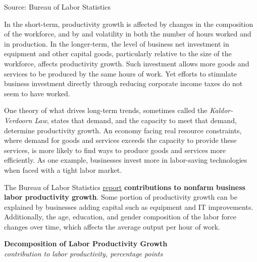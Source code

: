 \documentclass{report}
\makeatletter
\newcommand{\tbllink}[1]{\href{https://raw.githubusercontent.com/bdecon/US-chartbook/master/chartbook/data/#1}{\faTable}}
\newcommand*\short[1]{\expandafter\@gobbletwo\number\numexpr#1\relax}
\newcommand{\sbar}[4]{
		\addplot[ybar stacked, bar width=2.4pt, draw opacity=0, fill=#1] 
			table [x=#2, y=#3, col sep=comma]{#4};}
\newcommand{\dateaxisticks}{
		date coordinates in=x, axis line style={draw=none},
		xmax={2022-10-31},
		max space between ticks=40,	    
		xtick={{1990-01-01}, {1992-01-01}, {1994-01-01}, 
			{1996-01-01}, {1998-01-01}, {2000-01-01}, 
			{2002-01-01}, {2004-01-01}, {2006-01-01},
			{2008-01-01}, {2010-01-01}, {2012-01-01}, {2014-01-01},
		    {2016-01-01}, {2018-01-01}, {2020-01-01}, {2022-01-01}, 
		    {2024-01-01}, {2026-01-01}},
		minor xtick={{1989-01-01}, {1991-01-01}, {1993-01-01},
			{1995-01-01}, {1997-01-01}, {1999-01-01}, 
			{2001-01-01}, {2003-01-01}, {2005-01-01}, {2007-01-01},
		    {2009-01-01}, {2011-01-01}, {2013-01-01}, {2015-01-01},
		    {2017-01-01}, {2019-01-01}, {2021-01-01}, {2023-01-01}, 
		    {2025-01-01}, {2027-01-01}},
		enlarge y limits={0.06}, enlarge x limits={0.01},
		}
\newcommand{\bbar}[2]{extra #1 ticks = {{#2}}, extra #1 tick labels = ,
		extra #1 tick style = {grid=major, grid style={thick, black!25}},}
\newcommand{\rbars}{
		\fill[color=black!10] (axis cs:{1990-07-01},\pgfkeysvalueof{/pgfplots/ymin}) rectangle 
			(axis cs:{1991-03-01}, \pgfkeysvalueof{/pgfplots/ymax});
		\fill[color=black!10] (axis cs:{2007-12-01},\pgfkeysvalueof{/pgfplots/ymin}) rectangle 
			(axis cs:{2009-07-01}, \pgfkeysvalueof{/pgfplots/ymax});
		\fill[color=black!10] (axis cs:{2001-03-01},\pgfkeysvalueof{/pgfplots/ymin}) rectangle 
			(axis cs:{2001-11-01}, \pgfkeysvalueof{/pgfplots/ymax});
		\fill[color=black!10] (axis cs:{2020-02-01},\pgfkeysvalueof{/pgfplots/ymin}) rectangle 
			(axis cs:{2020-05-01}, \pgfkeysvalueof{/pgfplots/ymax});}
\makeatother
\begin{document}
{\begin{minipage}{0.76\textwidth}
\hspace{4mm} 

\footnotesize{Source: Bureau of Labor Statistics} \hfill \tbllink{lprod.csv}
\vspace{1.5mm}

\small In the short-term, productivity growth is affected by changes in the composition of the workforce, and by and volatility in both the number of hours worked and in production. In the longer-term, the level of business net investment in equipment and other capital goods, particularly relative to the size of the workforce, affects productivity growth. Such investment allows more goods and services to be produced by the same hours of work. Yet efforts to stimulate business investment directly through reducing corporate income taxes do not seem to have worked. 

One theory of what drives long-term trends, sometimes called the \textit{Kaldor-Verdoorn Law}, states that demand, and the capacity to meet that demand, determine productivity growth. An economy facing real resource constraints, where demand for goods and services exceeds the capacity to provide these services, is more likely to find ways to produce goods and services more efficiently. As one example, businesses invest more in labor-saving technologies when faced with a tight labor market. 
\end{minipage}
\newpage
\begin{minipage}{0.76\textwidth}
\small The Bureau of Labor Statistics \href{https://www.bls.gov/news.release/prod3.nr0.htm}{report} \textbf{contributions to nonfarm business labor productivity growth}. Some portion of productivity growth can be explained by businesses adding capital such as equipment and IT improvements. Additionally, the age, education, and gender composition of the labor force changes over time, which affects the average output per hour of work. 


\vspace{2mm}

\normalsize \textbf{Decomposition of Labor Productivity Growth}\\
\footnotesize{\textit{contribution to labor productivity, percentage points}}
\vspace{3.4cm}


\end{minipage}}
\end{document}
